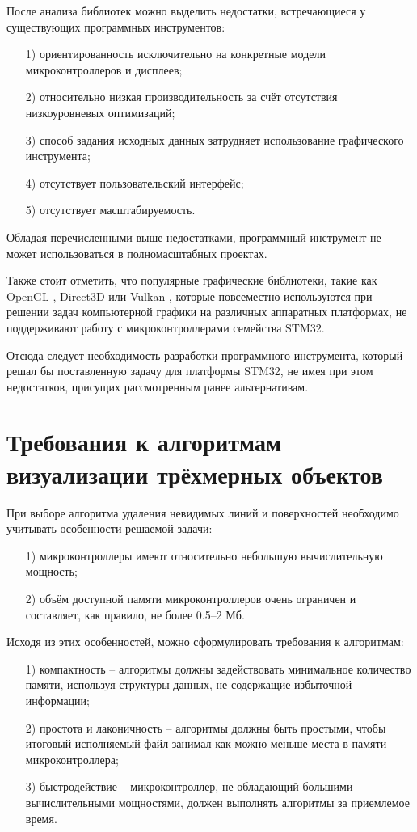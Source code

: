 После анализа библиотек можно выделить недостатки, встречающиеся у существующих программных инструментов:
\begin{enumerate}
	\item[1)] ориентированность исключительно на конкретные модели микроконтроллеров и дисплеев;
	\item[2)] относительно низкая производительность за счёт отсутствия низкоуровневых оптимизаций;
	\item[3)] способ задания исходных данных затрудняет использование графического инструмента;
	\item[4)] отсутствует пользовательский интерфейс;
	\item[5)] отсутствует масштабируемость.
\end{enumerate}

Обладая перечисленными выше недостатками, программный инструмент не может использоваться в полномасштабных проектах.

Также стоит отметить, что популярные графические библиотеки, такие как OpenGL \cite{opengl}, Direct3D \cite{direct3d} или Vulkan \cite{vulkan}, которые повсеместно используются при решении задач компьютерной графики на различных аппаратных платформах, не поддерживают работу с микроконтроллерами семейства STM32.

Отсюда следует необходимость разработки программного инструмента, который решал бы поставленную задачу для платформы STM32, не имея при этом недостатков, присущих рассмотренным ранее альтернативам.

\section{Требования к алгоритмам визуализации трёхмерных объектов}
При выборе алгоритма удаления невидимых линий и поверхностей необходимо учитывать особенности решаемой задачи:
\begin{enumerate}
	\item[1)] микроконтроллеры имеют относительно небольшую вычислительную мощность;
	\item[2)] объём доступной памяти микроконтроллеров очень ограничен и составляет, как правило, не более 0.5–2 Мб.
\end{enumerate}

Исходя из этих особенностей, можно сформулировать требования к алгоритмам:
\begin{enumerate}
	\item[1)] компактность – алгоритмы должны задействовать минимальное количество памяти, используя структуры данных, не содержащие избыточной информации;
	\item[2)] простота и лаконичность – алгоритмы должны быть простыми, чтобы итоговый исполняемый файл занимал как можно меньше места в памяти микроконтроллера;
	\item[3)] быстродействие – микроконтроллер, не обладающий большими вычислительными мощностями, должен выполнять алгоритмы за приемлемое время.
\end{enumerate}

